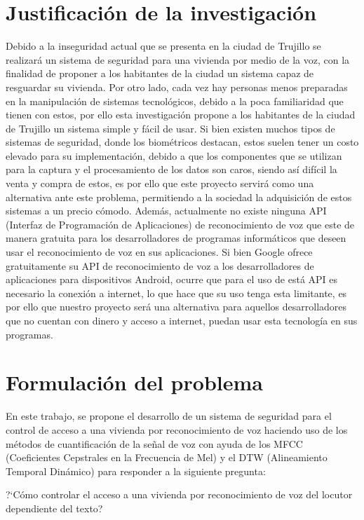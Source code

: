 \section{Justificación de la investigación}
Debido a la inseguridad actual que se presenta en la ciudad de Trujillo se realizará un sistema de seguridad para una vivienda por medio de la voz, con la finalidad de proponer a los habitantes de la ciudad un sistema capaz de resguardar su vivienda.
\vskip 0.5cm
Por otro lado, cada vez hay personas menos preparadas en la manipulación de sistemas tecnológicos, debido a la poca familiaridad que tienen con estos, por ello esta investigación propone a los habitantes de la ciudad de Trujillo un sistema simple y fácil de usar.
\vskip 0.5cm
Si bien existen muchos tipos de sistemas de seguridad, donde los biométricos destacan, estos suelen tener un costo elevado para su implementación, debido a que los componentes que se utilizan para la captura y el procesamiento de los datos son caros, siendo así difícil la venta y compra de estos, es por ello que este proyecto servirá como una alternativa ante este problema, permitiendo a la sociedad la adquisición de estos sistemas a un precio cómodo.
\vskip 0.5cm
Además, actualmente no existe ninguna API (Interfaz de Programación de Aplicaciones) de reconocimiento de voz que este de manera gratuita para los desarrolladores de programas informáticos que deseen usar el reconocimiento de voz en sus aplicaciones. Si bien Google ofrece gratuitamente su API de reconocimiento de voz a los desarrolladores de aplicaciones para dispositivos Android, ocurre que para el uso de está API es necesario la conexión a internet, lo que hace que su uso tenga esta limitante, es por ello que nuestro proyecto será una alternativa para aquellos desarrolladores que no cuentan con dinero y acceso a internet, puedan usar esta tecnología en sus programas.

\section{Formulación del problema}
En este trabajo, se propone el desarrollo de un sistema de seguridad para el control de acceso a una vivienda por reconocimiento de voz haciendo uso de los métodos de cuantificación de la señal de voz con ayuda de los MFCC (Coeficientes Cepstrales en la Frecuencia de Mel) y el DTW (Alineamiento Temporal Dinámico) para responder a la siguiente pregunta:
 \begin{center} 
     ?`Cómo controlar el acceso a una vivienda por reconocimiento de voz del locutor dependiente del texto?
 \end{center}

